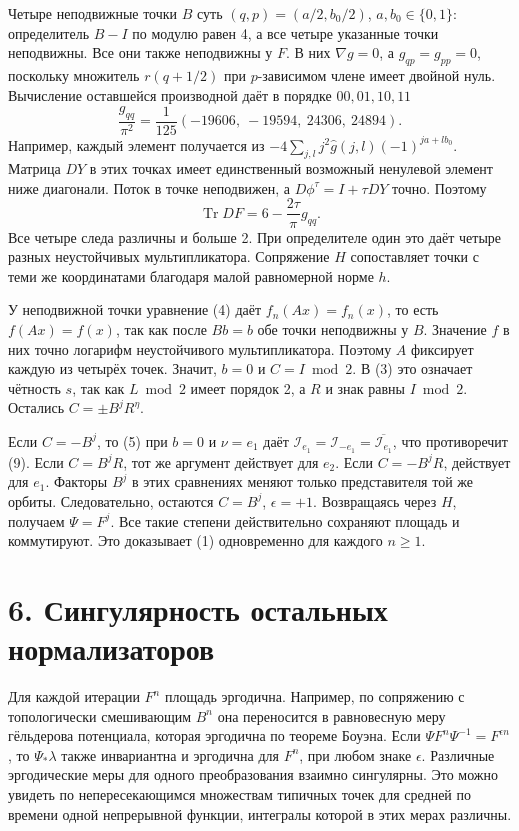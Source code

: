 \documentclass[11pt,a4paper]{article}
\newcommand{\Tr}{\operatorname{Tr}}
\newcommand{\sect}[1]{\section*{\sffamily\color{ink}#1}}
\begin{document}
Четыре неподвижные точки $B$ суть $(q,p)=(a/2,b_0/2)$, $a,b_0\in\{0,1\}$: определитель $B-I$ по модулю равен 4, а все четыре указанные точки неподвижны. Все они также неподвижны у $F$. В них $\nabla g=0$, а $g_{qp}=g_{pp}=0$, поскольку множитель $r(q+1/2)$ при $p$-зависимом члене имеет двойной нуль. Вычисление оставшейся производной даёт в порядке $00,01,10,11$
\[
       \frac{g_{qq}}{\pi^2}=\frac1{125}
              (-19606,\ -19594,\ 24306,\ 24894).
\]
Например, каждый элемент получается из $-4\sum_{j,l}j^2\widehat g(j,l)(-1)^{ja+lb_0}$. Матрица $DY$ в этих точках имеет единственный возможный ненулевой элемент ниже диагонали. Поток в точке неподвижен, а $D\phi^\tau=I+\tau DY$ точно. Поэтому
\[
                    \Tr DF = 6-\frac{2\tau}{\pi}g_{qq}.
\]
Все четыре следа различны и больше 2. При определителе один это даёт четыре разных неустойчивых мультипликатора. Сопряжение $H$ сопоставляет точки с теми же координатами благодаря малой равномерной норме $h$.

У неподвижной точки уравнение (4) даёт $f_n(Ax)=f_n(x)$, то есть $f(Ax)=f(x)$, так как после $Bb=b$ обе точки неподвижны у $B$. Значение $f$ в них точно логарифм неустойчивого мультипликатора. Поэтому $A$ фиксирует каждую из четырёх точек. Значит, $b=0$ и $C=I\bmod2$. В (3) это означает чётность $s$, так как $L\bmod2$ имеет порядок 2, а $R$ и знак равны $I\bmod2$. Остались $C=\pm B^j R^\eta$.

Если $C=-B^j$, то (5) при $b=0$ и $\nu=e_1$ даёт $\mathcal I_{e_1}=\mathcal I_{-e_1}=\overline{\mathcal I_{e_1}}$, что противоречит (9). Если $C=B^jR$, тот же аргумент действует для $e_2$. Если $C=-B^jR$, действует для $e_1$. Факторы $B^j$ в этих сравнениях меняют только представителя той же орбиты. Следовательно, остаются $C=B^j$, $\epsilon=+1$. Возвращаясь через $H$, получаем $\Psi=F^j$. Все такие степени действительно сохраняют площадь и коммутируют. Это доказывает (1) одновременно для каждого $n\ge1$.
\newpage
\sect{6. Сингулярность остальных нормализаторов}
Для каждой итерации $F^n$ площадь эргодична. Например, по сопряжению с топологически смешивающим $B^n$ она переносится в равновесную меру гёльдерова потенциала, которая эргодична по теореме Боуэна. Если $\Psi F^n\Psi^{-1}=F^{\epsilon n}$, то $\Psi_*\lambda$ также инвариантна и эргодична для $F^n$, при любом знаке $\epsilon$. Различные эргодические меры для одного преобразования взаимно сингулярны. Это можно увидеть по непересекающимся множествам типичных точек для средней по времени одной непрерывной функции, интегралы которой в этих мерах различны.
\end{document}
